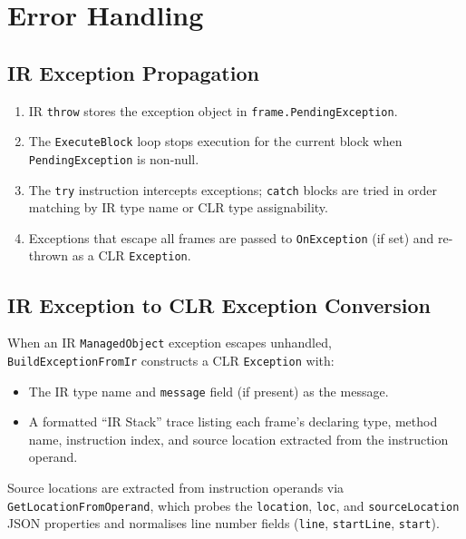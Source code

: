 \documentclass[11pt,a4paper]{article}
\newcommand{\code}[1]{\texttt{\small #1}}
\newcommand{\typename}[1]{\textcolor{typecolor}{\texttt{\small #1}}}
\begin{document}
\section{Error Handling}

\subsection{IR Exception Propagation}

\begin{enumerate}[leftmargin=2em]
  \item IR \code{throw} stores the exception object in \code{frame.PendingException}.
  \item The \code{ExecuteBlock} loop stops execution for the current block when
        \code{PendingException} is non-null.
  \item The \code{try} instruction intercepts exceptions; \code{catch} blocks are
        tried in order matching by IR type name or CLR type assignability.
  \item Exceptions that escape all frames are passed to \code{OnException} (if
        set) and re-thrown as a CLR \typename{Exception}.
\end{enumerate}

\subsection{IR Exception to CLR Exception Conversion}

When an IR \typename{ManagedObject} exception escapes unhandled,
\code{BuildExceptionFromIr} constructs a CLR \typename{Exception} with:

\begin{itemize}[leftmargin=2em, noitemsep]
  \item The IR type name and \code{message} field (if present) as the message.
  \item A formatted ``IR Stack'' trace listing each frame's declaring type,
        method name, instruction index, and source location extracted from the
        instruction operand.
\end{itemize}

Source locations are extracted from instruction operands via \code{GetLocationFromOperand},
which probes the \texttt{location}, \texttt{loc}, and \texttt{sourceLocation} JSON
properties and normalises line number fields (\texttt{line}, \texttt{startLine},
\texttt{start}).
\end{document}

